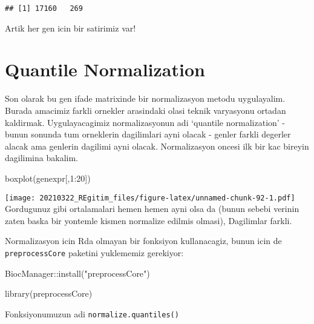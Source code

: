 \documentclass[
]{book}
\newenvironment{Shaded}{\begin{snugshade}}{\end{snugshade}}
\newcommand{\DecValTok}[1]{\textcolor[rgb]{0.00,0.00,0.81}{#1}}
\newcommand{\FunctionTok}[1]{\textcolor[rgb]{0.00,0.00,0.00}{#1}}
\newcommand{\NormalTok}[1]{#1}
\newcommand{\SpecialCharTok}[1]{\textcolor[rgb]{0.00,0.00,0.00}{#1}}
\newcommand{\StringTok}[1]{\textcolor[rgb]{0.31,0.60,0.02}{#1}}
\begin{document}
\begin{verbatim}
## [1] 17160   269
\end{verbatim}

Artik her gen icin bir satirimiz var!

\hypertarget{quantile-normalization}{%
\section{Quantile Normalization}\label{quantile-normalization}}

Son olarak bu gen ifade matrixinde bir normalizasyon metodu uygulayalim. Burada amacimiz farkli ornekler arasindaki olasi teknik varyasyonu ortadan kaldirmak. Uygulayacagimiz normalizasyonun adi `quantile normalization' - bunun sonunda tum orneklerin dagilimlari ayni olacak - genler farkli degerler alacak ama genlerin dagilimi ayni olacak. Normalizasyon oncesi ilk bir kac bireyin dagilimina bakalim.

\begin{Shaded}
\begin{Highlighting}[]
\FunctionTok{boxplot}\NormalTok{(genexpr[,}\DecValTok{1}\SpecialCharTok{:}\DecValTok{20}\NormalTok{])}
\end{Highlighting}
\end{Shaded}

\texttt{[image: 20210322\_REgitim\_files/figure-latex/unnamed-chunk-92-1.pdf]}
Gordugunuz gibi ortalamalari hemen hemen ayni olsa da (bunun sebebi verinin zaten baska bir yontemle kismen normalize edilmis olmasi), Dagilimlar farkli.

Normalizasyon icin Rda olmayan bir fonksiyon kullanacagiz, bunun icin de \texttt{preprocessCore} paketini yuklememiz gerekiyor:

\begin{Shaded}
\begin{Highlighting}[]
\NormalTok{BiocManager}\SpecialCharTok{::}\FunctionTok{install}\NormalTok{(}\StringTok{"preprocessCore"}\NormalTok{)}
\end{Highlighting}
\end{Shaded}

\begin{Shaded}
\begin{Highlighting}[]
\FunctionTok{library}\NormalTok{(preprocessCore)}
\end{Highlighting}
\end{Shaded}

Fonksiyonumuzun adi \texttt{normalize.quantiles()}
\end{document}
